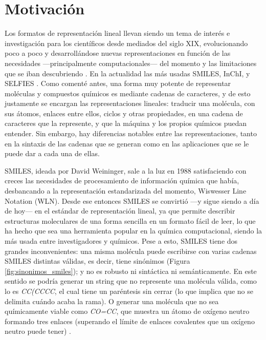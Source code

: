 \section{Motivación}

Los formatos de representación lineal llevan siendo un tema de interés e investigación para los científicos desde mediados del siglo XIX, evolucionando poco a poco y desarrollándose nuevas representaciones en función de las necesidades —principalmente computacionales— del momento y las limitaciones que se iban descubriendo \cite{107_years_linear_notations}. En la actualidad las más usadas SMILES, InChI, y SELFIES \cite{SELFIES}. Como comenté antes, una forma muy potente de representar moléculas y compuestos químicos es mediante cadenas de caracteres, y de esto justamente se encargan las representaciones lineales: traducir una molécula, con sus átomos, enlaces entre ellos, ciclos y otras propiedades, en una cadena de caracteres que la represente, y que la máquina y los propios químicos puedan entender. Sin embargo, hay diferencias notables entre las representaciones, tanto en la sintaxis de las cadenas que se generan como en las aplicaciones que se le puede dar a cada una de ellas.


SMILES, ideada por David Weininger, sale a la luz en 1988 satisfaciendo con creces las necesidades de procesamiento de información química que había, desbancando a la representación estandarizada del momento, Wiswesser Line Notation (WLN). Desde ese entonces SMILES se convirtió —y sigue siendo a día de hoy— en el estándar de representación lineal, ya que permite describir estructuras moleculares de una forma sencilla en un formato fácil de leer, lo que ha hecho que sea una herramienta popular en la química computacional, siendo la más usada entre investigadores y químicos. Pese a esto, SMILES tiene dos grandes inconvenientes: una misma molécula puede escribirse con varias cadenas SMILES distintas válidas, es decir, tiene sinónimos (Figura \ref{fig:sinonimos_smiles}); y no es robusto ni sintáctica ni semánticamente. En este sentido se podría generar un string que no represente una molécula válida, como lo es \emph{CC(CCCC}, el cual tiene un paréntesis sin cerrar (lo que implica que no se delimita cuándo acaba la rama). O generar una molécula que no sea químicamente viable como \emph{CO=CC}, que muestra un átomo de oxígeno neutro formando tres enlaces (superando el límite de enlaces covalentes que un oxígeno neutro puede tener) \cite{SELFIES}.

